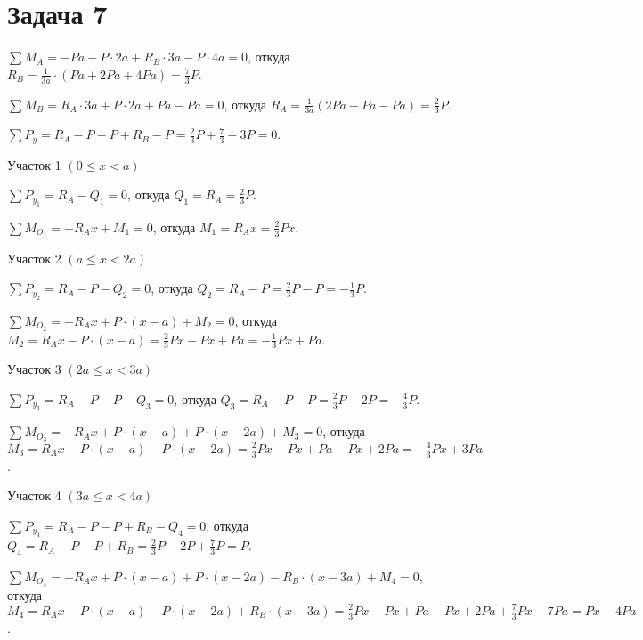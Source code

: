 \section{Задача 7}

$ \sum M_A = -Pa - P \cdot 2a + R_B \cdot 3a - P \cdot 4a = 0 $,
откуда $ R_B = \frac{1}{3a} \cdot \left(Pa + 2Pa + 4Pa\right) = \frac{7}{3}P $.

$ \sum M_B = R_A \cdot 3a + P \cdot 2a + Pa - Pa = 0 $,
откуда $ R_A = \frac{1}{3a} \left(2Pa + Pa - Pa\right) = \frac{2}{3}P $.

$ \sum P_y = R_A - P - P + R_B - P = \frac{2}{3}P + \frac{7}{3} - 3P = 0 $.

\vspace{1.5ex}

Участок 1 $ \left(0 \le x < a\right) $

$ \sum P_{y_1} = R_A - Q_1 = 0 $,
откуда $ Q_1 = R_A = \frac{2}{3}P $.

$ \sum M_{O_1} = -R_A x + M_1 = 0 $,
откуда $ M_1 = R_A x = \frac{2}{3} Px $.

\vspace{1.5ex}

Участок 2 $ \left(a \le x < 2a\right) $

$ \sum P_{y_2} = R_A - P - Q_2 = 0 $,
откуда $ Q_2 = R_A - P = \frac{2}{3}P - P = -\frac{1}{3}P$.

$ \sum M_{O_2} = -R_A x + P \cdot (x - a) + M_2 = 0 $,
откуда $ M_2 = R_A x - P \cdot (x - a) = \frac{2}{3}Px - Px + Pa = -\frac{1}{3}Px + Pa $.

\vspace{1.5ex}

Участок 3 $ \left(2a \le x < 3a\right) $

$ \sum P_{y_3} = R_A - P - P - Q_3 = 0 $,
откуда $ Q_3 = R_A - P - P = \frac{2}{3}P - 2P = -\frac{4}{3}P$.

$ \sum M_{O_3} = -R_A x + P \cdot (x - a) + P \cdot (x - 2a) + M_3 = 0 $,
откуда $ M_3 = R_A x - P \cdot (x - a) - P \cdot (x - 2a) = \frac{2}{3}Px - Px + Pa - Px + 2Pa = -\frac{4}{3}Px + 3Pa $.

\vspace{1.5ex}

Участок 4 $ \left(3a \le x < 4a\right) $

$ \sum P_{y_4} = R_A - P - P + R_B - Q_4 = 0 $,
откуда $ Q_4 = R_A - P - P + R_B = \frac{2}{3}P - 2P + \frac{7}{3}P = P $.

$ \sum M_{O_4} = -R_A x + P \cdot (x - a) + P \cdot (x - 2a) - R_B \cdot (x - 3a) + M_4 = 0 $,
откуда $ M_4 = R_A x - P \cdot (x - a) - P \cdot (x - 2a) + R_B \cdot (x - 3a) = \frac{2}{3}Px - Px + Pa - Px + 2Pa + \frac{7}{3}Px - 7Pa = Px - 4Pa $.


